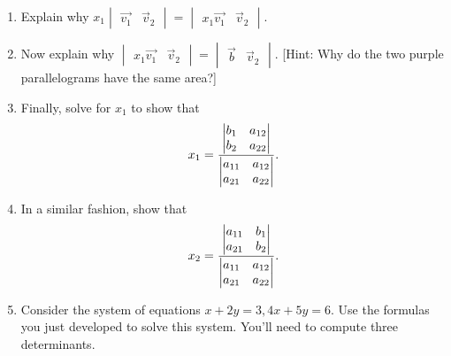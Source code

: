 \begin{problem}
\begin{enumerate}
 \item 
 Explain why $x_1\begin{vmatrix}\vec{v_1}&\vec v_2\end{vmatrix}=\begin{vmatrix}x_1\vec{v_1}&\vec v_2\end{vmatrix}$.  
\item Now explain why $\begin{vmatrix}x_1\vec{v_1}&\vec v_2\end{vmatrix} = \begin{vmatrix}\vec{b}&\vec v_2\end{vmatrix}$. [Hint: Why do the two purple parallelograms have the same area?]  
 \item Finally, solve for $x_1$ to show that $$x_1 = \frac{\begin{vmatrix}\begin{matrix} b_1\\b_2 \end{matrix}&\begin{matrix} a_{12}\\a_{22} \end{matrix} \end{vmatrix}}{\begin{vmatrix}\begin{matrix} a_{11}\\a_{21} \end{matrix}&\begin{matrix} a_{12}\\a_{22} \end{matrix} \end{vmatrix}}.$$
 \item In a similar fashion, show that $$x_2 =\frac{\begin{vmatrix}\begin{matrix} a_{11}\\a_{21} \end{matrix}&\begin{matrix} b_1\\b_2 \end{matrix}\end{vmatrix}}{\begin{vmatrix}\begin{matrix} a_{11}\\a_{21} \end{matrix}&\begin{matrix} a_{12}\\a_{22} \end{matrix} \end{vmatrix}}.$$ 
 \item Consider the system of equations $x+2y=3, 4x+5y=6$. Use the formulas you just developed to solve this system. You'll need to compute three determinants.
 \end{enumerate}
\end{problem}




